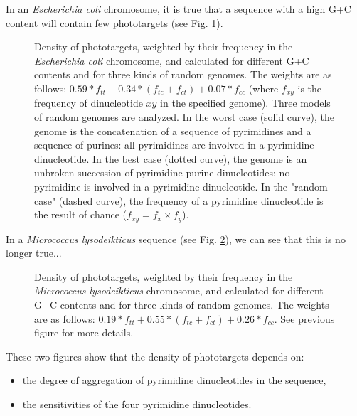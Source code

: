 \documentclass{article}
\begin{document}
In an \textit{Escherichia coli} chromosome, it is true that a sequence
with a high G+C content will contain few phototargets (see Fig.
\ref{GCcoli}).

\begin{figure}[H]
  \begin{center}
\end{center}
\caption{Density of phototargets, weighted by their frequency in the
  \textit{Escherichia coli} chromosome, and calculated for different
  G+C contents and for three kinds of random genomes. The weights are
  as follows: $0.59*f_{tt}+0.34*(f_{tc}+f_{ct})+0.07*f_{cc}$ (where
  $f_{xy}$ is the frequency of dinucleotide $xy$ in the specified
  genome). Three models of random genomes are analyzed. In the worst
  case (solid curve), the genome is the concatenation of a sequence of
  pyrimidines and a sequence of purines: all pyrimidines are involved
  in a pyrimidine dinucleotide. In the best case (dotted curve), the
  genome is an unbroken succession of pyrimidine-purine dinucleotides:
  no pyrimidine is involved in a pyrimidine dinucleotide. In the
  "random case" (dashed curve), the frequency of a pyrimidine
  dinucleotide is the result of chance ($f_{xy} = f_{x}\times
  f_{y}$).}
\label{GCcoli}
\end{figure}


In a \textit{Micrococcus lysodeikticus} sequence (see Fig.
\ref{GCmicro}), we can see that this is no longer true...


\begin{figure}[H]
   \begin{center}
\end{center}
\caption{Density of phototargets, weighted by their frequency in the
  \textit{Micrococcus lysodeikticus} chromosome, and calculated for
  different G+C contents and for three kinds of random genomes. The
  weights are as follows:
  $0.19*f_{tt}+0.55*(f_{tc}+f_{ct})+0.26*f_{cc}$. See previous figure
  for more details.}
\label{GCmicro}
\end{figure}

These two figures show that the density of phototargets depends on:

\begin{itemize}
\item the degree of aggregation of pyrimidine dinucleotides in the
sequence,
\item the sensitivities of the four pyrimidine dinucleotides.
  \end{itemize}
\end{document}
